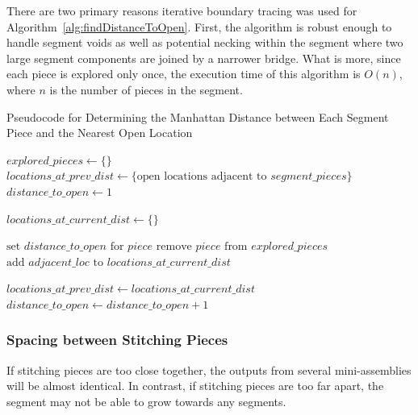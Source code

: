 There are two primary reasons iterative boundary tracing was used for Algorithm~\ref{alg:findDistanceToOpen}.  First, the algorithm is robust enough to handle segment voids as well as potential necking within the segment where two large segment components are joined by a narrower bridge. What is more, since each piece is explored only once, the execution time of this algorithm is $O(n)$, where $n$ is the number of pieces in the segment.

\begin{algorithm}[tb]
\caption{Pseudocode for Determining the Manhattan Distance between Each Segment Piece and the Nearest Open Location}\label{alg:findDistanceToOpen}
\begin{algorithmic}[1]
    \State $explored\_pieces \gets \{ \}$
    \State $locations\_at\_prev\_dist \gets \{ \text{open locations adjacent to } segment\_pieces \}$
    \State $distance\_to\_open \gets 1$
\item[]
     \label{op:distanceRoundWhileLoop}
        \State $locations\_at\_current\_dist \gets \{ \}$
\item[]
        		
        			\State $\text{set } distance\_to\_open \text{ for } piece$
        			\State $\text{remove } piece \text{ from } explored\_pieces$
        			\State $\text{add } adjacent\_loc \text{ to } locations\_at\_current\_dist$
        		\EndIf
        	\EndFor
        \EndFor
\item[]
    \State $locations\_at\_prev\_dist \gets locations\_at\_current\_dist$
    \State $distance\_to\_open \gets distance\_to\_open + 1$
    \EndWhile
\EndProcedure
\end{algorithmic}
\end{algorithm}


\subsubsection{Spacing between Stitching Pieces}\label{sec:spacingBetweenStitchingPieces}

If stitching pieces are too close together, the outputs from several mini-assemblies will be almost identical.  In contrast, if stitching pieces are too far apart, the segment may not be able to grow towards any segments.

